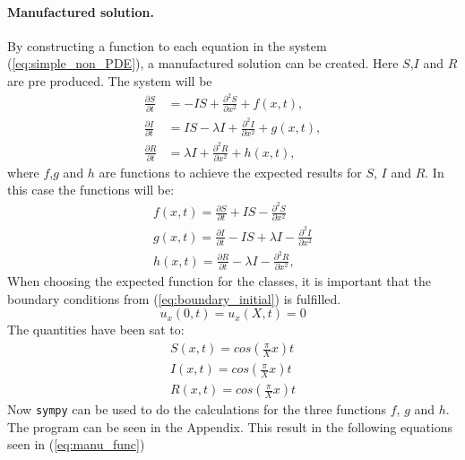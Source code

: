 \documentclass[%
twoside,                 %
final,                   %
10pt]{article}
\begin{document}
\paragraph{Manufactured solution.}
By constructing a function to each equation in the system (\ref{eq:simple_non_PDE}), a manufactured solution can be created. Here $S$,$I$ and $R$ are pre produced. The system will be
\begin{equation} \label{eq:simple_non_PDE2}
	\begin{aligned}
	\frac{\partial S}{\partial t} &= -IS + \frac{\partial^2 S}{\partial x^2}+f(x,t),\\
	\frac{\partial I}{\partial t} &= IS- \lambda I + \frac{\partial^2 I}{\partial x^2}+g(x,t),\\
	\frac{\partial R}{\partial t} &= \lambda I + \frac{\partial^2 R}{\partial x^2}+h(x,t),
	\end{aligned}
\end{equation}
where $f$,$g$ and $h$ are functions to achieve the expected results for $S$, $I$ and $R$. In this case the functions will be:
\begin{equation}
	\begin{aligned}
	f(x,t) = \frac{\partial S}{\partial t} + IS - \frac{\partial^2 S}{\partial x^2}\\
	g(x,t) = \frac{\partial I}{\partial t} - IS + \lambda I - \frac{\partial^2 I}{\partial x^2}\\
	h(x,t) = \frac{\partial R}{\partial t} -\lambda I - \frac{\partial^2 R}{\partial x^2},
	\end{aligned}
\end{equation}
When choosing the expected function for the classes, it is important that the boundary conditions from (\ref{eq:boundary_initial}) is fulfilled.
\begin{equation}
    u_x(0,t) = u_x(X,t) = 0
\end{equation}
The quantities have been sat to:
\begin{equation}
	\begin{aligned}
    S(x,t) = cos(\frac{\pi}{X}x)t\\
    I(x,t) = cos(\frac{\pi}{X}x)t\\
    R(x,t) = cos(\frac{\pi}{X}x)t
	\end{aligned}
\end{equation}
Now \Verb!sympy! can be used to do the calculations for the three functions $f$, $g$ and $h$. The program can be seen in the Appendix. This result in the following equations seen in (\ref{eq:manu_func}) 
\end{document}
